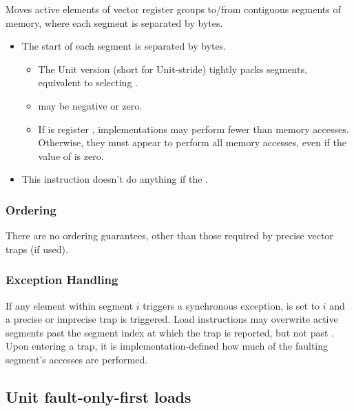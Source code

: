\noindent
Moves active elements of  vector register groups to/from contiguous segments of memory,
where each segment is separated by  bytes.

\begin{itemize}
    \item The start of each segment is separated by  bytes.
    \begin{itemize}
        \item The Unit version (short for Unit-stride) tightly packs segments, equivalent to selecting .
        \item {} may be negative or zero.
        \item If  is register , implementations may perform fewer than  memory accesses. Otherwise, they must appear to perform all memory accesses, even if the value of  is zero.
    \end{itemize}
    \item This instruction doesn't do anything if the .
\end{itemize}


\subsubsection*{Ordering}
There are no ordering guarantees, other than those required by precise vector traps (if used).

\subsubsection*{Exception Handling}
If any element within segment $i$ triggers a synchronous exception,  is set to $i$ and a precise or imprecise trap is triggered.
Load instructions may overwrite active segments past the segment index at which the trap is reported, but not past .\cite[Section 7.7]{RISCVVectorExtension2021}
Upon entering a trap, it is implementation-defined how much of the faulting segment's accesses are performed.

\subsection{Unit fault-only-first loads}\label{chap:bg:sec:rvv:fof}

